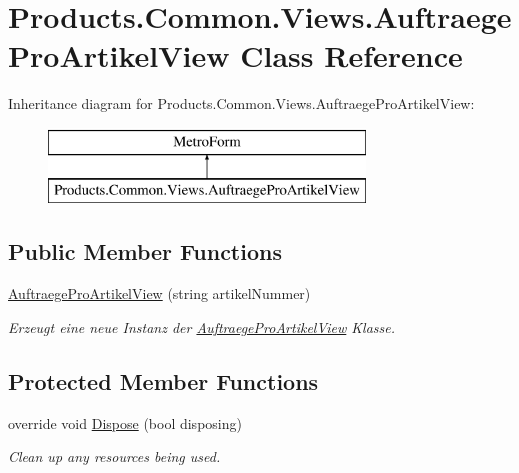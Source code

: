 \hypertarget{class_products_1_1_common_1_1_views_1_1_auftraege_pro_artikel_view}{}\section{Products.\+Common.\+Views.\+Auftraege\+Pro\+Artikel\+View Class Reference}
\label{class_products_1_1_common_1_1_views_1_1_auftraege_pro_artikel_view}
Inheritance diagram for Products.\+Common.\+Views.\+Auftraege\+Pro\+Artikel\+View\+:\begin{figure}[H]
\begin{center}
\leavevmode
\includegraphics[height=2.000000cm]{class_products_1_1_common_1_1_views_1_1_auftraege_pro_artikel_view}
\end{center}
\end{figure}
\subsection*{Public Member Functions}
\begin{DoxyCompactItemize}
\item 
\hyperlink{class_products_1_1_common_1_1_views_1_1_auftraege_pro_artikel_view_a4c778b46459f8323e25cefc9bc7ef269}{Auftraege\+Pro\+Artikel\+View} (string artikel\+Nummer)
\begin{DoxyCompactList}\small\item\em Erzeugt eine neue Instanz der \hyperlink{class_products_1_1_common_1_1_views_1_1_auftraege_pro_artikel_view}{Auftraege\+Pro\+Artikel\+View} Klasse. \end{DoxyCompactList}\end{DoxyCompactItemize}
\subsection*{Protected Member Functions}
\begin{DoxyCompactItemize}
\item 
override void \hyperlink{class_products_1_1_common_1_1_views_1_1_auftraege_pro_artikel_view_a29c6cedc5c7b2195fe7bed3281b73552}{Dispose} (bool disposing)
\begin{DoxyCompactList}\small\item\em Clean up any resources being used. \end{DoxyCompactList}\end{DoxyCompactItemize}


